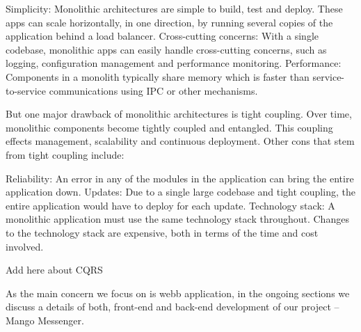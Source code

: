 Simplicity: Monolithic architectures are simple to build, test and deploy.
These apps can scale horizontally, in one direction, by running several copies of the application behind a load balancer.
Cross-cutting concerns: With a single codebase, monolithic apps can easily handle cross-cutting concerns, such as logging,
configuration management and performance monitoring.
Performance: Components in a monolith typically share memory which is faster than service-to-service communications using IPC or other mechanisms.

But one major drawback of monolithic architectures is tight coupling.
Over time, monolithic components become tightly coupled and entangled.
This coupling effects management, scalability and continuous deployment.
Other cons that stem from tight coupling include:

Reliability: An error in any of the modules in the application can bring the entire application down.
Updates: Due to a single large codebase and tight coupling, the entire application would have to deploy for each update.
Technology stack: A monolithic application must use the same technology stack throughout.
Changes to the technology stack are expensive, both in terms of the time and cost involved.

Add here about CQRS

As the main concern we focus on is webb application, in the ongoing sections we discuss a details of both, front-end and back-end
development of our project -- Mango Messenger.